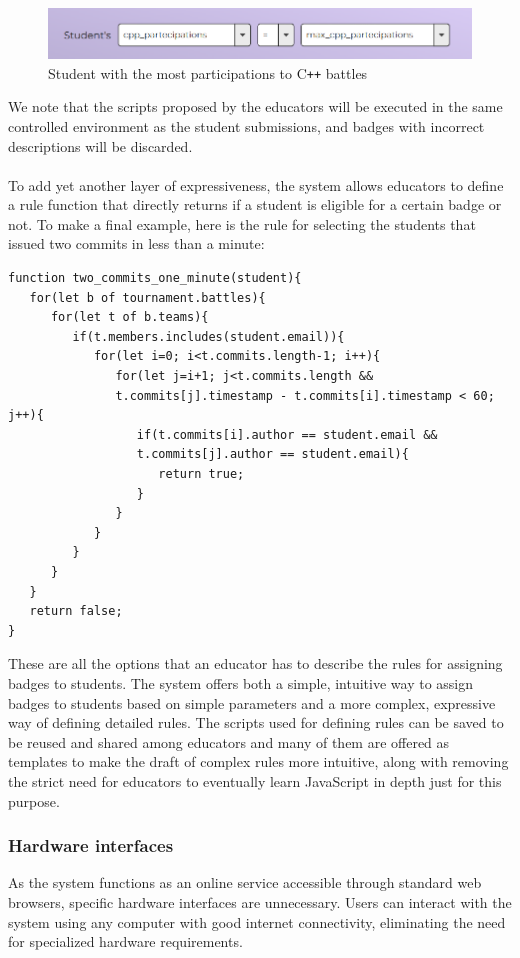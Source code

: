 \begin{figure}[H]
    \centering
    \includegraphics[width=0.9\linewidth]{Images/UI_Badge_form3.png}
    \caption{Student with the most participations to C\texttt{++} battles}
    \label{fig:UI_form3}
\end{figure}
We note that the scripts proposed by the educators will be executed in the same controlled environment as the student submissions, and badges with incorrect descriptions will be discarded.\\
\\
To add yet another layer of expressiveness, the system allows educators to define a rule function that directly returns if a student is eligible for a certain badge or not. To make a final example, here is the rule for selecting the students that issued two commits in less than a minute:
\newpage
\begin{verbatim}
function two_commits_one_minute(student){
   for(let b of tournament.battles){
      for(let t of b.teams){
         if(t.members.includes(student.email)){
            for(let i=0; i<t.commits.length-1; i++){
               for(let j=i+1; j<t.commits.length &&
               t.commits[j].timestamp - t.commits[i].timestamp < 60; j++){
                  if(t.commits[i].author == student.email &&
                  t.commits[j].author == student.email){
                     return true;
                  }
               }
            }
         }
      }
   }
   return false;
}
\end{verbatim}
These are all the options that an educator has to describe the rules for assigning badges to students. The system offers both a simple, intuitive way to assign badges to students based on simple parameters and a more complex, expressive way of defining detailed rules. The scripts used for defining rules can be saved to be reused and shared among educators and many of them are offered as templates to make the draft of complex rules more intuitive, along with removing the strict need for educators to eventually learn JavaScript in depth just for this purpose.

\subsubsection{Hardware interfaces}
As the system functions as an online service accessible through standard web browsers, specific hardware interfaces are unnecessary. Users can interact with the system using any computer with good internet connectivity, eliminating the need for specialized hardware requirements.

